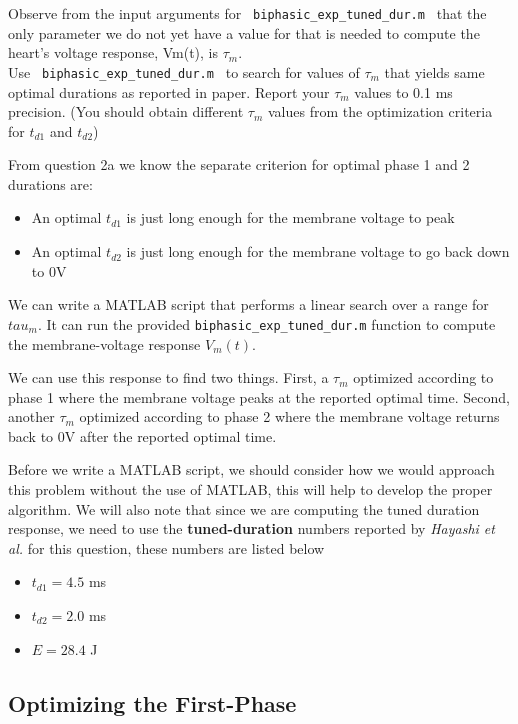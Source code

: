 \documentclass[]{report}
\begin{document}
Observe from the input arguments for \texttt{ biphasic\_exp\_tuned\_dur.m } that the only parameter 
we do not yet have a value for that is needed to compute the heart’s voltage response, Vm(t), is $\tau_m$.\\ 
Use \texttt{ biphasic\_exp\_tuned\_dur.m } to search for values of $\tau_m$ that yields same optimal durations as reported in paper. Report your $\tau_m$ values to 0.1 ms precision. (You should obtain different $\tau_m$ values from the optimization criteria for $t_{d1}$ and $t_{d2}$)

From question 2a  we know the separate criterion for optimal phase 1 and 2 durations are:
\begin{itemize}
	\item An optimal $t_{d1}$ is just long enough for the membrane voltage to peak
	\item An optimal $t_{d2}$ is just long enough for the membrane voltage to go back down to 0V
\end{itemize}

We can write a MATLAB script that performs a linear search over a range  for $tau_m$. It can run the provided \texttt{biphasic\_exp\_tuned\_dur.m} function to compute the membrane-voltage response $V_m(t)$.

We can use this response to find two things. First, a $\tau_m$ optimized according to phase 1 where the membrane voltage peaks at the reported optimal time. Second, another $\tau_m$ optimized according to phase 2 where the membrane voltage returns back to 0V after the reported optimal time.

Before we write a MATLAB script, we should consider how we would approach this problem without the use of MATLAB, this will help to develop the proper algorithm. We will also note that since we are computing the tuned duration response, we need to use the \textbf{tuned-duration} numbers reported by \textit{Hayashi et al.} for this question, these numbers are listed below

\begin{itemize}
	\item $t_{d1} = 4.5$ ms
	\item $t_{d2} = 2.0$ ms
	\item $E = 28.4$ J
\end{itemize}

\subsection*{Optimizing the First-Phase}
\end{document}
